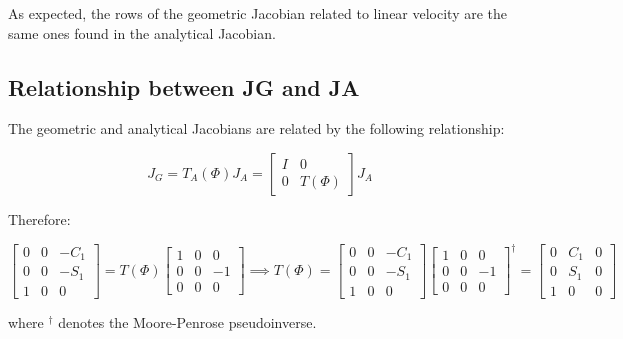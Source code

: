 As expected, the rows of the geometric Jacobian related to linear velocity are the same ones found in the analytical Jacobian.

\subsection{Relationship between JG and JA}

The geometric and analytical Jacobians are related by the following relationship:

\begin{equation*}
J_G = T_A(\Phi)J_A=\begin{bmatrix}
I&0\\0&T(\Phi)
\end{bmatrix}J_A
\end{equation*}

Therefore:

\begin{equation*}
\begin{bmatrix}
0&0 & -C_1\\
0&0&-S_1 \\
    1& 0&0
\end{bmatrix} = T(\Phi)\begin{bmatrix}
1 & 0 & 0\\
0 & 0 & -1\\
0 & 0 & 0
\end{bmatrix}\implies T(\Phi) = \begin{bmatrix}
0&0 & -C_1\\
0&0&-S_1 \\
    1& 0&0
\end{bmatrix}\begin{bmatrix}
1 & 0 & 0\\
0 & 0 & -1\\
0 & 0 & 0
\end{bmatrix}^{\dagger} = \begin{bmatrix}
0 & C_1 & 0\\ 0 & S_1 & 0\\ 1 & 0 & 0
\end{bmatrix}
\end{equation*}

where $^\dagger$ denotes the Moore-Penrose pseudoinverse.